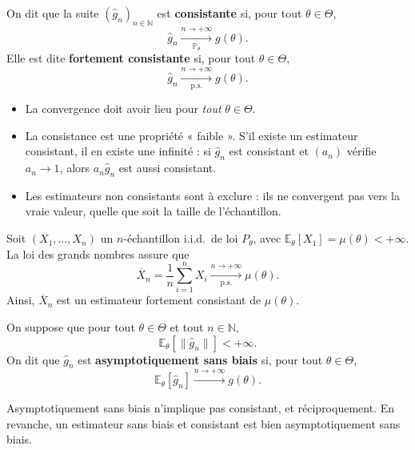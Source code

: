 \smallskip

\begin{mdframed}
\begin{definition}[Consistance]
On dit que la suite $(\hat{g}_n)_{n \in \mathbb{N}}$ est \textbf{consistante} si, pour tout $\theta \in \Theta$,
\[
\hat{g}_n \xrightarrow[\mathbb{P}_\theta]{n \to +\infty} g(\theta).
\]
Elle est dite \textbf{fortement consistante} si, pour tout $\theta \in \Theta$,
\[
\hat{g}_n \xrightarrow[\text{p.s.}]{n \to +\infty} g(\theta).
\]
\end{definition}
\end{mdframed}

\begin{remarque}
\begin{itemize}
    \item La convergence doit avoir lieu pour \emph{tout} $\theta \in \Theta$.
    \item La consistance est une propriété « faible ». S'il existe un estimateur consistant, il en existe une infinité : si $\hat{g}_n$ est consistant et $(a_n)$ vérifie $a_n \to 1$, alors $a_n \hat{g}_n$ est aussi consistant.
    \item Les estimateurs non consistants sont à exclure : ils ne convergent pas vers la vraie valeur, quelle que soit la taille de l'échantillon.
\end{itemize}
\end{remarque}

\begin{exemple}
Soit $(X_1, \ldots, X_n)$ un $n$-échantillon i.i.d.\ de loi $P_\theta$, avec $\mathbb{E}_\theta[X_1] = \mu(\theta) < +\infty$.  
La loi des grands nombres assure que
\[
\overline{X}_n = \frac{1}{n}\sum_{i=1}^n X_i \xrightarrow[\text{p.s.}]{n \to +\infty} \mu(\theta).
\]
Ainsi, $\overline{X}_n$ est un estimateur fortement consistant de $\mu(\theta)$.
\end{exemple}

\begin{definition}
On suppose que pour tout $\theta \in \Theta$ et tout $n \in \mathbb{N}$,
\[
\mathbb{E}_\theta\!\left[\|\hat{g}_n\|\right] < +\infty.
\]
On dit que $\hat{g}_n$ est \textbf{asymptotiquement sans biais} si, pour tout $\theta \in \Theta$,
\[
\mathbb{E}_\theta[\hat{g}_n] \xrightarrow{n \to +\infty} g(\theta).
\]
\end{definition}

\begin{remarque}
Asymptotiquement sans biais n'implique pas consistant, et réciproquement. En revanche, un estimateur sans biais et consistant est bien asymptotiquement sans biais.
\end{remarque}

